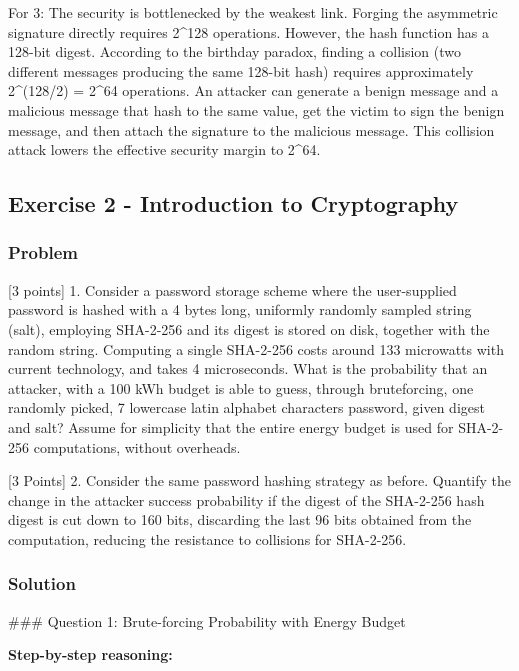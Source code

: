 \documentclass{article}
\begin{document}
For 3: The security is bottlenecked by the weakest link. Forging the asymmetric signature directly requires 2\textasciicircum{}128 operations. However, the hash function has a 128-bit digest. According to the birthday paradox, finding a collision (two different messages producing the same 128-bit hash) requires approximately 2\textasciicircum{}(128/2) = 2\textasciicircum{}64 operations. An attacker can generate a benign message and a malicious message that hash to the same value, get the victim to sign the benign message, and then attach the signature to the malicious message. This collision attack lowers the effective security margin to 2\textasciicircum{}64.

\subsection{Exercise 2 - Introduction to Cryptography}
\subsubsection*{Problem}
[3 points] 1. Consider a password storage scheme where the user-supplied password is hashed with a 4 bytes long, uniformly randomly sampled string (salt), employing SHA-2-256 and its digest is stored on disk, together with the random string. Computing a single SHA-2-256 costs around 133 microwatts with current technology, and takes 4 microseconds. What is the probability that an attacker, with a 100 kWh budget is able to guess, through bruteforcing, one randomly picked, 7 lowercase latin alphabet characters password, given digest and salt? Assume for simplicity that the entire energy budget is used for SHA-2-256 computations, without overheads.

[3 Points] 2. Consider the same password hashing strategy as before. Quantify the change in the attacker success probability if the digest of the SHA-2-256 hash digest is cut down to 160 bits, discarding the last 96 bits obtained from the computation, reducing the resistance to collisions for SHA-2-256.

\subsubsection*{Solution}
\#\#\# Question 1: Brute-forcing Probability with Energy Budget

\textbf{Step-by-step reasoning:}
\end{document}
